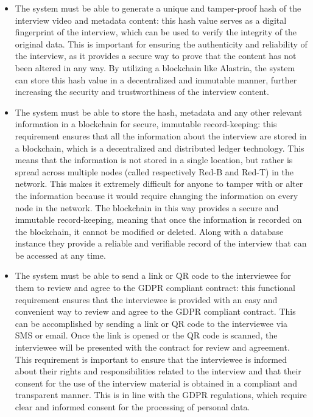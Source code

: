 \documentclass[target=mst,aauheader=]{thud}
\begin{document}
\begin{itemize}

    \item The system must be able to generate a unique and tamper-proof hash of the interview video and metadata content:
    this hash value serves as a digital fingerprint of the interview, which can be used to verify the integrity of the original data. This is important for ensuring the authenticity and reliability of the interview, as it provides a secure way to prove that the content has not been altered in any way. By utilizing a blockchain like Alastria, the system can store this hash value in a decentralized and immutable manner, further increasing the security and trustworthiness of the interview content.
    \item The system must be able to store the hash, metadata and any other relevant information in a blockchain for secure, immutable record-keeping:
    this requirement ensures that all the information about the interview are stored in a blockchain, which is a decentralized and distributed ledger technology. This means that the information is not stored in a single location, but rather is spread across multiple nodes (called respectively Red-B and Red-T) in the network. This makes it extremely difficult for anyone to tamper with or alter the information because it would require changing the information on every node in the network. The blockchain in this way provides a secure and immutable record-keeping, meaning that once the information is recorded on the blockchain, it cannot be modified or deleted. Along with a database instance they provide a reliable and verifiable record of the interview that can be accessed at any time.
    \item The system must be able to send a link or QR code to the interviewee for them to review and agree to the GDPR compliant contract:
    this functional requirement ensures that the interviewee is provided with an easy and convenient way to review and agree to the GDPR compliant contract. This can be accomplished by sending a link or QR code to the interviewee via SMS or email. Once the link is opened or the QR code is scanned, the interviewee will be presented with the contract for review and agreement. This requirement is important to ensure that the interviewee is informed about their rights and responsibilities related to the interview and that their consent for the use of the interview material is obtained in a compliant and transparent manner. This is in line with the GDPR regulations, which require clear and informed consent for the processing of personal data.

\end{itemize}
\end{document}
